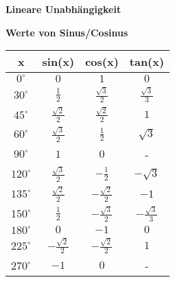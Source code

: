 \documentclass[10pt,twocolumn,a4paper]{article}
\begin{document}
\begin{flushleft}
\textbf{Lineare Unabhängigkeit}

\textbf{Werte von Sinus/Cosinus}

\begin{tabular}{|c|c|c|c|}
\hline
\rule[-1ex]{0pt}{2.5ex} x & sin(x) & cos(x) & tan(x) \\
\hline
\rule[-1ex]{0pt}{2.5ex} $0^\circ$ & $0$ & $1$ & $0$ \\
\hline
\rule[-1ex]{0pt}{2.5ex} $30^\circ$ & $\frac{1}{2}$ & $\frac{\sqrt{3}}{2}$ & $\frac{\sqrt{3}}{3}$ \\
\hline
\rule[-1ex]{0pt}{2.5ex} $45^\circ$ & $\frac{\sqrt{2}}{2}$ & $\frac{\sqrt{2}}{2}$ & $1$ \\
\hline
\rule[-1ex]{0pt}{2.5ex} $60^\circ$ & $\frac{\sqrt{3}}{2}$ & $\frac{1}{2}$ & $\sqrt{3}$ \\
\hline
\rule[-1ex]{0pt}{2.5ex} $90^\circ$ & $1$ & $0$ & - \\
\hline
\rule[-1ex]{0pt}{2.5ex} $120^\circ$ & $\frac{\sqrt{3}}{2}$ & $-\frac{1}{2}$ & $-\sqrt{3}$ \\
\hline
\rule[-1ex]{0pt}{2.5ex} $135^\circ$ & $\frac{\sqrt{2}}{2}$ & $-\frac{\sqrt{2}}{2}$ & $-1$ \\
\hline
\rule[-1ex]{0pt}{2.5ex} $150^\circ$ & $\frac{1}{2}$ & $-\frac{\sqrt{3}}{2}$ & $-\frac{\sqrt{3}}{3}$ \\
\hline
\rule[-1ex]{0pt}{2.5ex} $180^\circ$ & $0$ & $-1$ & $0$ \\
\hline
\rule[-1ex]{0pt}{2.5ex} $225^\circ$ & $-\frac{\sqrt{2}}{2}$ & $-\frac{\sqrt{2}}{2}$ & $1$ \\
\hline
\rule[-1ex]{0pt}{2.5ex} $270^\circ$ & $-1$ & $0$ & - \\
\hline
\end{tabular}


\end{flushleft}
\end{document}
